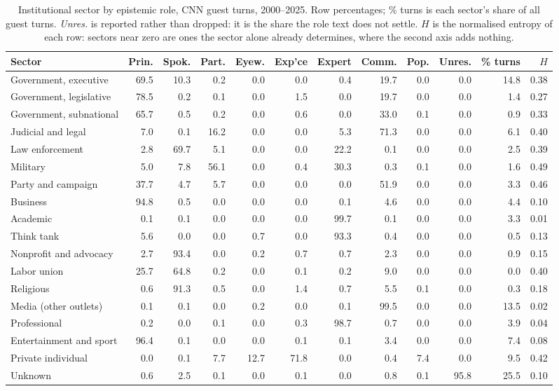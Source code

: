 \begin{table}[htbp]
\centering\footnotesize\setlength{\tabcolsep}{3pt}
\caption{Institutional sector by epistemic role, CNN guest turns, 2000--2025. Row percentages; \% turns is each sector's share of all guest turns. \emph{Unres.} is reported rather than dropped: it is the share the role text does not settle. $H$ is the normalised entropy of each row: sectors near zero are ones the sector alone already determines, where the second axis adds nothing.}
\label{tab:crossing}
\begin{tabular}{lrrrrrrrrrrr}
\hline\hline
Sector & Prin. & Spok. & Part. & Eyew. & Exp'ce & Expert & Comm. & Pop. & Unres. & \% turns & $H$ \\
\hline
Government, executive & 69.5 & 10.3 & 0.2 & 0.0 & 0.0 & 0.4 & 19.7 & 0.0 & 0.0 & 14.8 & 0.38 \\
Government, legislative & 78.5 & 0.2 & 0.1 & 0.0 & 1.5 & 0.0 & 19.7 & 0.0 & 0.0 & 1.4 & 0.27 \\
Government, subnational & 65.7 & 0.5 & 0.2 & 0.0 & 0.6 & 0.0 & 33.0 & 0.1 & 0.0 & 0.9 & 0.33 \\
Judicial and legal & 7.0 & 0.1 & 16.2 & 0.0 & 0.0 & 5.3 & 71.3 & 0.0 & 0.0 & 6.1 & 0.40 \\
Law enforcement & 2.8 & 69.7 & 5.1 & 0.0 & 0.0 & 22.2 & 0.1 & 0.0 & 0.0 & 2.5 & 0.39 \\
Military & 5.0 & 7.8 & 56.1 & 0.0 & 0.4 & 30.3 & 0.3 & 0.1 & 0.0 & 1.6 & 0.49 \\
Party and campaign & 37.7 & 4.7 & 5.7 & 0.0 & 0.0 & 0.0 & 51.9 & 0.0 & 0.0 & 3.3 & 0.46 \\
Business & 94.8 & 0.5 & 0.0 & 0.0 & 0.0 & 0.1 & 4.6 & 0.0 & 0.0 & 4.4 & 0.10 \\
Academic & 0.1 & 0.1 & 0.0 & 0.0 & 0.0 & 99.7 & 0.1 & 0.0 & 0.0 & 3.3 & 0.01 \\
Think tank & 5.6 & 0.0 & 0.0 & 0.7 & 0.0 & 93.3 & 0.4 & 0.0 & 0.0 & 0.5 & 0.13 \\
Nonprofit and advocacy & 2.7 & 93.4 & 0.0 & 0.2 & 0.7 & 0.7 & 2.3 & 0.0 & 0.0 & 0.9 & 0.15 \\
Labor union & 25.7 & 64.8 & 0.2 & 0.0 & 0.1 & 0.2 & 9.0 & 0.0 & 0.0 & 0.0 & 0.40 \\
Religious & 0.6 & 91.3 & 0.5 & 0.0 & 1.4 & 0.7 & 5.5 & 0.1 & 0.0 & 0.3 & 0.18 \\
Media (other outlets) & 0.1 & 0.1 & 0.0 & 0.2 & 0.0 & 0.1 & 99.5 & 0.0 & 0.0 & 13.5 & 0.02 \\
Professional & 0.2 & 0.0 & 0.1 & 0.0 & 0.3 & 98.7 & 0.7 & 0.0 & 0.0 & 3.9 & 0.04 \\
Entertainment and sport & 96.4 & 0.1 & 0.0 & 0.0 & 0.1 & 0.1 & 3.4 & 0.0 & 0.0 & 7.4 & 0.08 \\
Private individual & 0.0 & 0.1 & 7.7 & 12.7 & 71.8 & 0.0 & 0.4 & 7.4 & 0.0 & 9.5 & 0.42 \\
Unknown & 0.6 & 2.5 & 0.1 & 0.0 & 0.1 & 0.0 & 0.8 & 0.1 & 95.8 & 25.5 & 0.10 \\
\hline\hline
\end{tabular}
\end{table}

